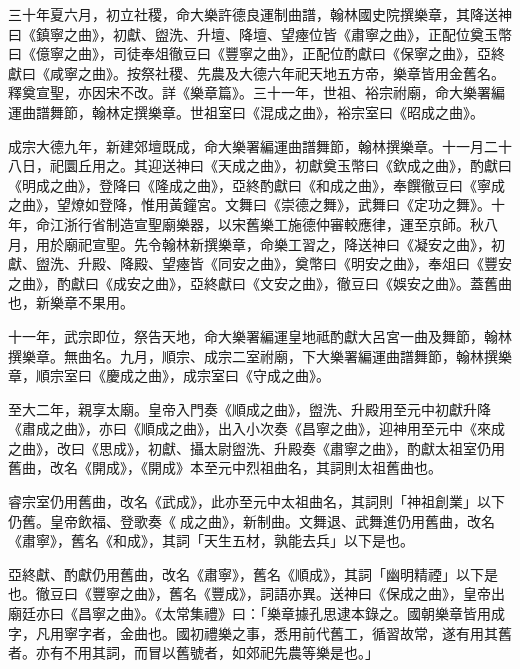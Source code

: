 \begin{pinyinscope}
 三十年夏六月，初立社稷，命大樂許德良運制曲譜，翰林國史院撰樂章，其降送神曰《鎮寧之曲》，初獻、盥洗、升壇、降壇、望瘞位皆《肅寧之曲》，正配位奠玉幣曰《億寧之曲》，司徒奉俎徹豆曰《豐寧之曲》，正配位酌獻曰《保寧之曲》，亞終獻曰《咸寧之曲》。按祭社稷、先農及大德六年祀天地五方帝，樂章皆用金舊名。釋奠宣聖，亦因宋不改。詳《樂章篇》。三十一年，世祖、裕宗祔廟，命大樂署編運曲譜舞節，翰林定撰樂章。世祖室曰《混成之曲》，裕宗室曰《昭成之曲》。



 成宗大德九年，新建郊壇既成，命大樂署編運曲譜舞節，翰林撰樂章。十一月二十八日，祀圜丘用之。其迎送神曰《天成之曲》，初獻奠玉幣曰《欽成之曲》，酌獻曰《明成之曲》，登降曰《隆成之曲》，亞終酌獻曰《和成之曲》，奉饌徹豆曰《寧成之曲》，望燎如登降，惟用黃鐘宮。文舞曰《崇德之舞》，武舞曰《定功之舞》。十年，命江浙行省制造宣聖廟樂器，以宋舊樂工施德仲審較應律，運至京師。秋八月，用於廟祀宣聖。先令翰林新撰樂章，命樂工習之，降送神曰《凝安之曲》，初獻、盥洗、升殿、降殿、望瘞皆《同安之曲》，奠幣曰《明安之曲》，奉俎曰《豐安之曲》，酌獻曰《成安之曲》，亞終獻曰《文安之曲》，徹豆曰《娛安之曲》。蓋舊曲也，新樂章不果用。



 十一年，武宗即位，祭告天地，命大樂署編運皇地祗酌獻大呂宮一曲及舞節，翰林撰樂章。無曲名。九月，順宗、成宗二室祔廟，下大樂署編運曲譜舞節，翰林撰樂章，順宗室曰《慶成之曲》，成宗室曰《守成之曲》。



 至大二年，親享太廟。皇帝入門奏《順成之曲》，盥洗、升殿用至元中初獻升降《肅成之曲》，亦曰《順成之曲》，出入小次奏《昌寧之曲》，迎神用至元中《來成之曲》，改曰《思成》，初獻、攝太尉盥洗、升殿奏《肅寧之曲》，酌獻太祖室仍用舊曲，改名《開成》，《開成》本至元中烈祖曲名，其詞則太祖舊曲也。



 睿宗室仍用舊曲，改名《武成》，此亦至元中太祖曲名，其詞則「神祖創業」以下仍舊。皇帝飲福、登歌奏《成之曲》，新制曲。文舞退、武舞進仍用舊曲，改名《肅寧》，舊名《和成》，其詞「天生五材，孰能去兵」以下是也。



 亞終獻、酌獻仍用舊曲，改名《肅寧》，舊名《順成》，其詞「幽明精禋」以下是也。徹豆曰《豐寧之曲》，舊名《豐成》，詞語亦異。送神曰《保成之曲》，皇帝出廟廷亦曰《昌寧之曲》。《太常集禮》曰：「樂章據孔思逮本錄之。國朝樂章皆用成字，凡用寧字者，金曲也。國初禮樂之事，悉用前代舊工，循習故常，遂有用其舊者。亦有不用其詞，而冒以舊號者，如郊祀先農等樂是也。」




\end{pinyinscope}
